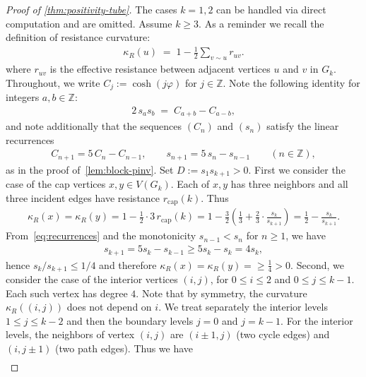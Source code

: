 \documentclass[11pt,a4paper]{amsart}
\newcommand{\resistance}[1]{\kappa_R\left({#1}\right)}
\begin{document}
\begin{proof}[Proof of \cref{thm:positivity-tube}]
    The cases $k=1, 2$ can be handled via direct computation and are omitted. Assume $k\ge 3$. As a reminder we recall the definition of resistance curvature:
        \begin{align*}
            \resistance{u}\;=\;1-\frac12\sum_{v\sim u} r_{uv}.
        \end{align*}
    where $r_{uv}$ is the effective resistance between adjacent vertices $u$ and $v$ in $G_k$. Throughout, we write $C_j:=\cosh(j\varphi)$ for $j\in\mathbb{Z}$. Note the following identity for integers $a,b\in\mathbb{Z}$:
        \begin{align}\label{eq:prod-to-sum}
            2\,s_a s_b \;=\; C_{a+b}-C_{a-b},
        \end{align}
    and note additionally that the sequences $(C_n)$ and $(s_n)$ satisfy the linear recurrences
        \begin{align}\label{eq:recurrences}
            C_{n+1}=5\,C_n-C_{n-1},\qquad s_{n+1}=5\,s_n-s_{n-1}\qquad(n\in\mathbb Z),
        \end{align}
    as in the proof of~\cref{lem:block-pinv}. Set $D:=s_1 s_{k+1}>0$. First we consider the case of the cap vertices $x, y\in V(G_k)$. Each of $x,y$ has three neighbors and all three incident edges have resistance $r_{\mathrm{cap}}(k)$. Thus
        \begin{align*}
            \resistance{x}=\resistance{y}=1-\frac12\cdot 3\,r_{\mathrm{cap}}(k)
    =1-\frac32\left(\frac{1}{3}+\frac{2}{3}\cdot\frac{s_k}{s_{k+1}}\right)
    =\frac12-\frac{s_k}{s_{k+1}}.
        \end{align*}
    From~\cref{eq:recurrences} and the monotonicity $s_{n-1}<s_n$ for $n\ge1$, we have
        \begin{align*}
            s_{k+1}=5s_k-s_{k-1}\ge 5s_k-s_k=4s_k,
        \end{align*}
    hence $s_k/s_{k+1}\le 1/4$ and therefore $\resistance{x} = \resistance{y}= \ge \frac{1}{4} > 0$. Second, we consider the case of the interior vertices $(i,j)$, for $0\le i\le 2$ and $0\le j\le k-1$. Each such vertex has degree $4$. Note that by symmetry, the curvature $\resistance{(i, j)}$ does not depend on $i$. We treat separately the interior levels $1\le j\le k-2$ and then the boundary levels $j=0$ and $j=k-1$. For the interior levels, the neighbors of vertex $(i,j)$ are $(i\pm1,j)$ (two cycle edges) and $(i,j\pm1)$ (two path edges). Thus we have
        \begin{align*}

\end{align*}
\end{proof}
\end{document}
